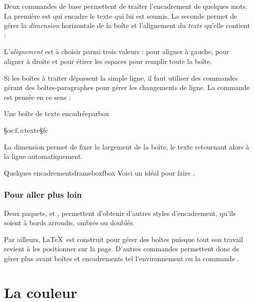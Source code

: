 Deux commandes de base permettent de traiter l'encadrement de quelques mots. La première est  qui encadre le texte qui lui est soumis. La seconde permet de gérer la \emph{dimension} horizontale de la boîte et l'alignement du \emph{texte} qu'elle contient :

\begin{codesimple}{Une boîte encadrée}{framebox}
}
\end{codesimple}

L'\emph{alignement} est à choisir parmi trois valeurs :  pour aligner à gauche,  pour aligner à droite et  pour étirer les espaces pour remplir toute la boîte.

Si les boîtes à traiter dépassent la simple ligne, il faut utiliser des commandes gérant des boîtes-paragraphes pour gérer les changements de ligne. La commande  est pensée en ce sens :

\begin{codesimple}{Une boîte de texte encadrée}{parbox}
\parbox{§oc£¤dimension§fc}{§oc£¤texte§fc}
\end{codesimple}

La dimension permet de fixer la largement de la boîte, le texte retournant alors à la ligne automatiquement.

\begin{codedouble}{Quelques encadrements}{frameboxfbox}
Voici un  idéal pour faire  
. 
\end{codedouble}


\subsubsection{Pour aller plus loin}

Deux paquets,  et , permettent d'obtenir d'autres styles d'encadrement, qu'ils soient à bords arrondis, ombrés ou doublés.

Par ailleurs, \LaTeX\ est construit pour gérer des boîtes puisque tout son travail revient à les positionner sur la page. D'autres commandes permettent donc de gérer plus avant boîtes et encadrements tel l'environnement  ou la commande .


\section{La couleur} 

